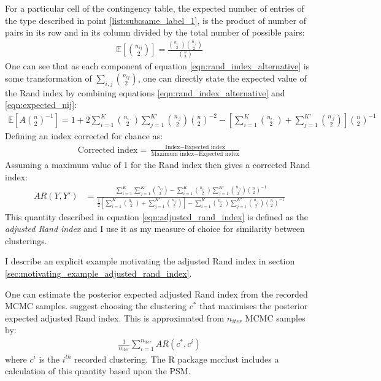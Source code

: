 \documentclass[12pt]{article} %
\begin{document}
	For a particular cell of the contingency table, the expected number of entries of the type described in point \ref{list:sub:same_label_1}, is the product of number of pairs in its row and in its column divided by the total number of possible pairs:
	\begin{eqnarray} \label{eqn:expected_nij}
	\mathbb{E}\left[\binom{n_{ij}}{2}\right] = \frac{\binom{n_{i\cdot}}{2}\binom{n_{\cdot j}}{2}}{\binom{n}{2}}
	\end{eqnarray}
	One can see that as each component of equation \ref{eqn:rand_index_alternative} is some transformation of $\sum_{i,j}\binom{n_{ij}}{2}$, one can directly state the expected value of the Rand index by combining equations \ref{eqn:rand_index_alternative} and \ref{eqn:expected_nij}:
	\begin{eqnarray}
	\mathbb{E}\left[A \binom{n}{2}^{-1}\right] = 1 + 2 \sum_{i=1}^{K} \binom{n_{i \cdot}}{2} \sum_{j=1}^{K'} \binom{n_{\cdot j}}{2} \binom{n}{2}^{-2} - \left[\sum_{i=1}^{K} \binom{n_{i \cdot}}{2} + \sum_{j=1}^{K'} \binom{n_{\cdot j}}{2}\right] \binom{n}{2}^{-1}
	\end{eqnarray}
	Defining an index corrected for chance as:
	\begin{eqnarray}
	\text{Corrected index} = \frac{\text{Index} - \text{Expected index}}{\text{Maximum index} - \text{Expected index}}
	\end{eqnarray}
	Assuming a maximum value of 1 for the Rand index then gives a corrected Rand index:
	\begin{eqnarray} \label{eqn:adjusted_rand_index}
	AR(Y, Y') &= \frac{\sum_{i=1}^{K}\sum_{j=1}^{K'} \binom{n_{ij}}{2} - \sum_{i=1}^{K} \binom{n_{i \cdot}}{2} \sum_{j=1}^{K'} \binom{n_{\cdot j}}{2} \binom{n}{2}^{-1}}{\frac{1}{2} \left[\sum_{i=1}^{K} \binom{n_{i \cdot}}{2} + \sum_{j=1}^{K'} \binom{n_{\cdot j}}{2}\right] - \sum_{i=1}^{K} \binom{n_{i \cdot}}{2} \sum_{j=1}^{K'} \binom{n_{\cdot j}}{2} \binom{n}{2}^{-1}}
	\end{eqnarray}
	This quantity described in equation \ref{eqn:adjusted_rand_index} is defined as the \emph{adjusted Rand index} and I use it as my measure of choice for similarity between clusterings.
	
	I describe an explicit example motivating the adjusted Rand index in section \ref{sec:motivating_example_adjusted_rand_index}.
	
	One can estimate the posterior expected adjusted Rand index from the recorded MCMC samples. \citet{FritschImprovedcriteriaclustering2009} suggest choosing the clustering $c^*$ that maximises the posterior expected adjusted Rand index. This is approximated from $n_{iter}$ MCMC samples by:
	\begin{align} \label{eqn:PEAR}
	\frac{1}{n_{iter}}\sum_{i=1}^{n_{iter}} AR(c^*, c^i)
	\end{align}
	where $c^i$ is the $i^{th}$ recorded clustering. The R package mcclust \citep{FritschMcclust2012} includes a calculation of this quantity based upon the PSM.
	
\end{document}
